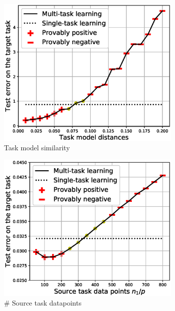 \begin{figure}
	\begin{subfigure}[b]{0.31\textwidth}
		\centering
		\includegraphics[width=0.98\textwidth]{figures/model_shift_phase_transition.eps}
		\caption{Task model similarity}
	\end{subfigure}\hfill
	\begin{subfigure}[b]{0.31\textwidth}
		\centering
		\includegraphics[width=0.98\textwidth]{figures/datapoints_phase_transition.eps}
		\caption{\# Source task datapoints}
	\end{subfigure}\hfill
	\begin{subfigure}[b]{0.31\textwidth}

\end{subfigure}
\end{figure}
